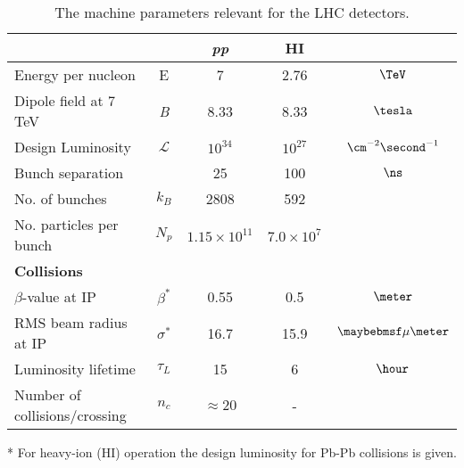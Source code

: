 \begin{table}[!htb]
  \centering
  \begin{threeparttable}
    \begin{tabular}{|lcccc|}
    \hline 
                                  &              &           \textit{pp} &         \textbf{HI} &  \\
    \hline
    Energy per nucleon            & E            &                     7 &                2.76 &                 $\TeV$ \\
    Dipole field at 7 TeV         & \textit{B}   &                  8.33 &                8.33 &               $\tesla$ \\
    Design Luminosity\tnote{*}    & $\mathcal{L}$ &            $10^{34}$ &           $10^{27}$ & $\cm^{-2}\second^{-1}$ \\
    Bunch separation              &              &                    25 &                 100 &                  $\ns$ \\
    No. of bunches                & $k_B$        &                  2808 &                 592 &                        \\
    No. particles per bunch       & $N_p$        & $1.15 \times 10^{11}$ & $7.0 \times 10^{7}$ &                        \\
    \hline
    \hline
    \textbf{Collisions}           &              &  &  &  \\
    \hline
    $\beta$-value at IP           & $\beta^{*}$  &                  0.55 &                 0.5 &        $\meter$ \\
    RMS beam radius at IP         & $\sigma^{*}$ &                  16.7 &                15.9 &    $\mu \meter$ \\
    Luminosity lifetime           & $\tau_L$     &                    15 &                   6 &         $\hour$ \\
    Number of collisions/crossing & $n_c$        &          $\approx 20$ &                   - &                 \\
    \hline
    \end{tabular}
    \begin{tablenotes}
      \item[*] For heavy-ion (HI) operation the design luminosity for Pb-Pb collisions is given.
    \end{tablenotes}
  \end{threeparttable}
  \caption[LHC parameters relevant for detectors]{The machine parameters relevant for the 
                                                  LHC detectors.\cite{CMSTDR:CMSPhysicsVol1}}
  \label{TABLE:ExperimentalApparatus_LHCMachineParameters}
\end{table}
